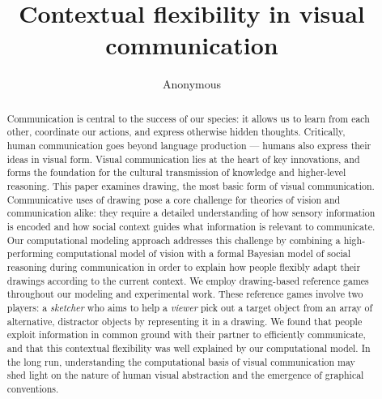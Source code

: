 \documentclass[manuscript]{stjour}
\begin{document}
\title{Contextual flexibility in visual communication}

\author[Author Names]
{Anonymous}





\begin{abstract}
Communication is central to the success of our species: it allows us to learn from each other, coordinate our actions, and express otherwise hidden thoughts. Critically, human communication goes beyond language production --- humans also express their ideas in visual form. Visual communication lies at the heart of key innovations, and forms the foundation for the cultural transmission of knowledge and higher-level reasoning. This paper examines drawing, the most basic form of visual communication. Communicative uses of drawing pose a core challenge for theories of vision and communication alike: they require a detailed understanding of how sensory information is encoded and how social context guides what information is relevant to communicate. Our computational modeling approach addresses this challenge by combining a high-performing computational model of vision with a formal Bayesian model of social reasoning during communication in order to explain how people flexibly adapt their drawings according to the current context. We employ drawing-based reference games throughout our modeling and experimental work. These reference games involve two players: a \textit{sketcher} who aims to help a \textit{viewer} pick out a target object from an array of alternative, distractor objects by representing it in a drawing. We found that people exploit information in common ground with their partner to efficiently communicate, and that this contextual flexibility was well explained by our computational model. In the long run, understanding the computational basis of visual communication may shed light on the nature of human visual abstraction and the emergence of graphical conventions.

\end{abstract}
\end{document}
